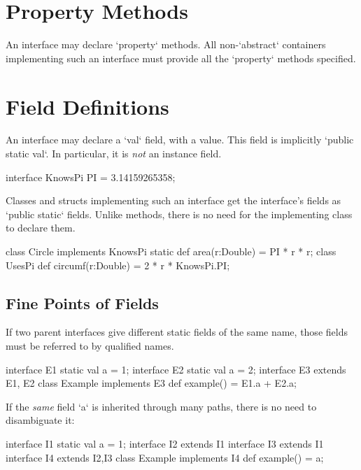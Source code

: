 \section{Property Methods}

An interface may declare \xcd`property` methods.  All non-\xcd`abstract`
containers implementing such an interface must provide all the \xcd`property`
methods specified.  

\section{Field Definitions}

An interface may declare a \xcd`val` field, with a value.  This field is implicitly
\xcd`public static val`.  In particular, it is {\em not} an instance field. 
\begin{xten}
interface KnowsPi {
  PI = 3.14159265358;
}
\end{xten}
%

Classes and structs implementing such an interface get the interface's fields as
\xcd`public static` fields.  Unlike  methods, there is no need
for the implementing class to declare them. 
\begin{xten}
class Circle implements KnowsPi {
  static def area(r:Double) = PI * r * r;
}
class UsesPi {
  def circumf(r:Double) = 2 * r * KnowsPi.PI;
}
\end{xten}
%

\subsection{Fine Points of Fields}

If two parent interfaces give different static fields of the same name, 
those fields must be referred to by qualified names.
% 
\begin{xten}
interface E1 {static val a = 1;}
interface E2 {static val a = 2;}
interface E3 extends E1, E2{}
class Example implements E3 {
  def example() = E1.a + E2.a;
}
\end{xten}
%

If the {\em same} field \xcd`a` is inherited through many paths, there is no need to
disambiguate it:
\begin{xten}
interface I1 { static val a = 1;} 
interface I2 extends I1 {}
interface I3 extends I1 {}
interface I4 extends I2,I3 {}
class Example implements I4 {
  def example() = a;
}
\end{xten}
%

